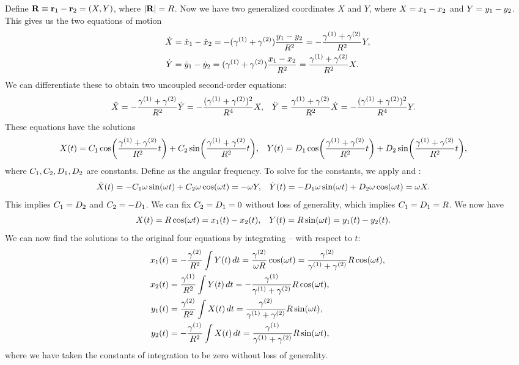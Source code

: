 \begin{solution}
	Define $\mathbf{R} \equiv \mathbf{r}_1 - \mathbf{r}_2 = (X, Y)$, where $|\mathbf{R}| = R$.  Now we have two generalized coordinates $X$ and $Y$, where $X = x_1 - x_2$ and $Y = y_1 - y_2$.  This gives us the two equations of motion
	\begin{align}
		\dot{X} &= \dot{x}_1 - \dot{x}_2
		= -(\gamma^{(1)} + \gamma^{(2)}) \frac{y_1 - y_2}{R^2}
		= -\frac{\gamma^{(1)} + \gamma^{(2)}}{R^2} Y, \label{eqnX} \\
		\dot{Y} &= \dot{y}_1 - \dot{y}_2
		= (\gamma^{(1)} + \gamma^{(2)}) \frac{x_1 - x_2}{R^2}
		= \frac{\gamma^{(1)} + \gamma^{(2)}}{R^2} X. \label{eqnY}
	\end{align}
	We can differentiate these to obtain two uncoupled second-order equations:
	\begin{align*}
		\ddot{X} &= -\frac{\gamma^{(1)} + \gamma^{(2)}}{R^2} \dot{Y}
		= -\frac{(\gamma^{(1)} + \gamma^{(2)})^2}{R^4} X, &
		\ddot{Y} &= \frac{\gamma^{(1)} + \gamma^{(2)}}{R^2} \dot{X}
		= -\frac{(\gamma^{(1)} + \gamma^{(2)})^2}{R^4} Y.
	\end{align*}
	These equations have the solutions
	\begin{align*}
		X(t) &= C_1 \cos(\frac{\gamma^{(1)} + \gamma^{(2)}}{R^2} t) + C_2 \sin(\frac{\gamma^{(1)} + \gamma^{(2)}}{R^2} t), &
		Y(t) &= D_1 \cos(\frac{\gamma^{(1)} + \gamma^{(2)}}{R^2} t) + D_2 \sin(\frac{\gamma^{(1)} + \gamma^{(2)}}{R^2} t),
	\end{align*}
	where $C_1, C_2, D_1, D_2$ are constants.  Define
	\beqn \label{omg}
		\omg \equiv {}
	\eeqn
	as the angular frequency.  To solve for the constants, we apply  and :
	\begin{align*}
		\dot{X}(t) &= -C_1 \omega \sin(\omega t) + C_2 \omega \cos(\omega t) = -\omega Y, &
		\dot{Y}(t) &= -D_1 \omega \sin(\omega t) + D_2 \omega \cos(\omega t) = \omega X.
	\end{align*}
	This implies $C_1 = D_2$ and $C_2 = -D_1$.  We can fix $C_2 = D_1 = 0$ without loss of generality, which implies $C_1 = D_1 = R$.  We now have
	\begin{align} \label{2eqns}
		X(t) &= R \cos(\omega t) = x_1(t) - x_2(t), &
		Y(t) &= R \sin(\omega t) = y_1(t) - y_2(t).
	\end{align}
	We can now find the solutions to the original four equations by integrating -- with respect to $t$:
	\begin{align*}
		x_1(t) &= -\frac{\gamma^{(2)}}{R^2} \int Y(t) \dd{t}
		= \frac{\gamma^{(2)}}{\omega R} \cos(\omega t)
		= \frac{\gamma^{(2)}}{\gamma^{(1)} + \gamma^{(2)}} R \cos(\omega t), \\
		x_2(t) &= \frac{\gamma^{(1)}}{R^2} \int Y(t) \dd{t}
		= -\frac{\gamma^{(1)}}{\gamma^{(1)} + \gamma^{(2)}} R \cos(\omega t), \\
		y_1(t) &= \frac{\gamma^{(2)}}{R^2} \int X(t) \dd{t}
		= \frac{\gamma^{(2)}}{\gamma^{(1)} + \gamma^{(2)}} R \sin(\omega t), \\
		y_2(t) &= -\frac{\gamma^{(1)}}{R^2} \int X(t) \dd{t}
		= \frac{\gamma^{(1)}}{\gamma^{(1)} + \gamma^{(2)}} R \sin(\omega t),
	\end{align*}
	where we have taken the constants of integration to be zero without loss of generality.


\end{solution}
